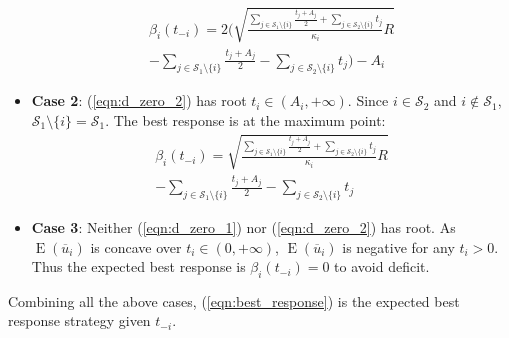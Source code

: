 \documentclass{IEEEtran}
\begin{document}
\begin{IEEEproof}
\begin{itemize}
\begin{equation}
\label{eqn:d_zero_sol_1}
\begin{aligned}
\beta_i(t_{-i})=2(\sqrt{\frac{\sum_{j\in\mathcal{S}_1\setminus\{i\}}\frac{t_j+A_j}{2}+\sum_{j\in\mathcal{S}_2\setminus\{i\}}t_j}{\kappa_i}R}\\
-\sum_{j\in\mathcal{S}_1\setminus\{i\}}\frac{t_j+A_j}{2}-\sum_{j\in\mathcal{S}_2\setminus\{i\}}t_j)-A_i
\end{aligned}
\end{equation}

\item {\bf Case 2}: (\ref{eqn:d_zero_2}) has root $t_i\in (A_i,+\infty)$. Since $i\in\mathcal{S}_2$ and $i\notin\mathcal{S}_1$, $\mathcal{S}_1\setminus\{i\}=\mathcal{S}_1$. The best response is at the maximum point:
\begin{equation}
\label{eqn:d_zero_sol_2}
\begin{aligned}
\beta_i(t_{-i})=\sqrt{\frac{\sum_{j\in\mathcal{S}_1\setminus\{i\}}\frac{t_j+A_j}{2}+\sum_{j\in\mathcal{S}_2\setminus\{i\}}t_j}{\kappa_i}R}\\
-\sum_{j\in\mathcal{S}_1\setminus\{i\}}\frac{t_j+A_j}{2}-\sum_{j\in\mathcal{S}_2\setminus\{i\}}t_j
\end{aligned}
\end{equation}

\item {\bf Case 3}: Neither (\ref{eqn:d_zero_1}) nor (\ref{eqn:d_zero_2}) has root. As $\operatorname{E}(\overline{u}_i)$ is concave over $t_i\in(0,+\infty)$, $\operatorname{E}(\overline{u}_i)$ is negative for any $t_i>0$. Thus the expected best response is $\beta_i(t_{-i})=0$ to avoid deficit.
\end{itemize}
Combining all the above cases, (\ref{eqn:best_response}) is the expected best response strategy given $t_{-i}$.
\end{IEEEproof}

\end{document}
